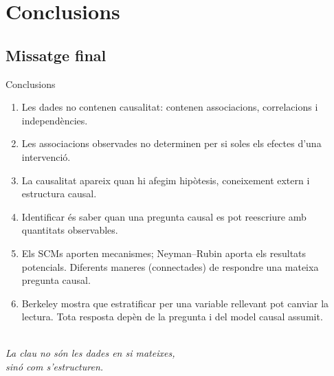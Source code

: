 \documentclass{bestbeamer}
\begin{document}
\section{Conclusions}
\subsection{Missatge final}

\begin{frame}{Conclusions}
  \begin{enumerate}
    \item Les dades no contenen causalitat: contenen associacions,
      correlacions i independències.
    \item Les associacions observades no determinen per si soles els efectes d'una intervenció.
    \item La causalitat apareix quan hi afegim hipòtesis, coneixement extern i estructura causal.
    \item Identificar és saber quan una pregunta causal es pot reescriure amb quantitats observables.
    \item Els SCMs aporten mecanismes; Neyman--Rubin aporta els resultats potencials. Diferents maneres (connectades) de respondre una mateixa pregunta causal.
    \item Berkeley mostra que estratificar per una variable rellevant pot canviar la lectura. Tota resposta depèn de la pregunta i del model causal assumit.
  \end{enumerate}
  \begin{center}
    \bestgradientrule[.78\textwidth]\\
    {\Large\itshape
      La clau no són les dades en si mateixes, \\ sinó com s'estructuren.}
  \end{center}
\end{frame}


\begin{frame}[plain]
  \titlepage
\end{frame}

\end{document}
